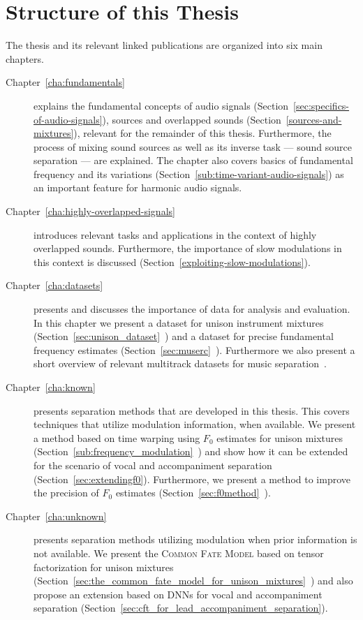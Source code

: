 \clearpage

\section{Structure of this Thesis}

The thesis and its relevant linked publications are organized into six main chapters.
\begin{description}
  \item[Chapter~\ref{cha:fundamentals}] explains the fundamental concepts of audio signals (Section~\ref{sec:specifics-of-audio-signals}), sources and overlapped sounds (Section~\ref{sources-and-mixtures}), relevant for the remainder of this thesis.
  Furthermore, the process of mixing sound sources as well as its inverse task --- sound source separation --- are explained.
  The chapter also covers basics of fundamental frequency and its variations (Section~\ref{sub:time-variant-audio-signals}) as an important feature for harmonic audio signals.
  \item[Chapter~\ref{cha:highly-overlapped-signals}] introduces relevant tasks and applications in the context of highly overlapped sounds.
  Furthermore, the importance of slow modulations in this context is discussed (Section~\ref{exploiting-slow-modulations}).
  \item[Chapter~\ref{cha:datasets}] presents and discusses the importance of data for analysis and evaluation.
  In this chapter we present a dataset for unison instrument mixtures (Section~\ref{sec:unison_dataset}~\cite{oss_unison, stoeter14}) and a dataset for precise fundamental frequency estimates (Section~\ref{sec:muserc}~\cite{oss_muserc, stoeter15acm}). Furthermore we also present a short overview of relevant multitrack datasets for music separation~\cite{liutkus17, stoeter18sisec}.
  \item[Chapter~\ref{cha:known}] presents separation methods that are developed in this thesis. This covers techniques that utilize modulation information, when available. We present a method based on time warping using $F_0$ estimates for unison mixtures (Section~\ref{sub:frequency_modulation}~\cite{stoeter14}) and show how it can be extended for the scenario of vocal and accompaniment separation (Section~\ref{sec:extendingf0}). Furthermore, we present a method to improve the precision of $F_0$ estimates (Section~\ref{sec:f0method}~\cite{stoeter15icassp}).
  \item[Chapter~\ref{cha:unknown}] presents separation methods utilizing modulation when prior information is not available. We present the \textsc{Common Fate Model} based on tensor factorization for unison mixtures (Section~\ref{sec:the_common_fate_model_for_unison_mixtures}~\cite{stoeter16}) and also propose an extension based on DNNs for vocal and accompaniment separation (Section~\ref{sec:cft_for_lead_accompaniment_separation}).

\end{description}
